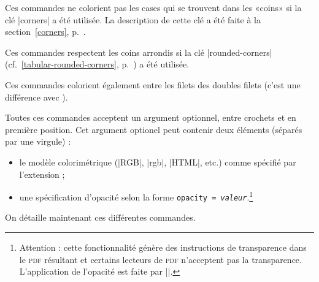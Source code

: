 \documentclass[dvipsnames]{article}
\begin{document}
\medskip
Ces commandes ne colorient pas les cases qui se trouvent dans les «coins» si la
clé |corners| a été utilisée. La description de cette clé a été faite à la
section~\ref{corners}, p.~\pageref{corners}.

\medskip
Ces commandes respectent les coins arrondis si la clé |rounded-corners|
(cf.~\ref{tabular-rounded-corners}, p.~\pageref{tabular-rounded-corners}) a été
utilisée.

\medskip
Ces commandes colorient également entre les filets des doubles filets (c'est une différence
avec ).

\medskip
Toutes ces commandes acceptent un argument optionnel, entre crochets et en
première position. Cet argument optionel peut contenir deux éléments (séparés
par une virgule) :
\begin{itemize}[beginpenalty=10000]
\item le modèle colorimétrique (|RGB|, |rgb|, |HTML|, etc.) comme spécifié par
l'extension  ;
\item {}
une spécification d'opacité selon la forme \texttt{opacity =
  \textsl{valeur}}.\footnote{Attention : cette fonctionnalité génère des instructions de
  transparence dans le \textsc{pdf} résultant et certains lecteurs de
  \textsc{pdf} n'acceptent pas la transparence. L'application de l'opacité est faite par
  |\pgfsetfillopacity|.}
\end{itemize}


\medskip
On détaille maintenant ces différentes commandes.
\end{document}
